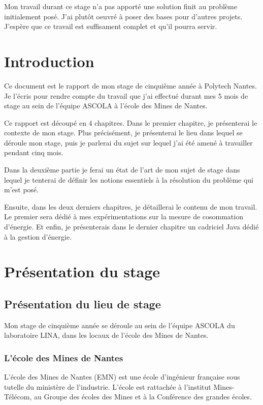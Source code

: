\documentclass[a4paper, 11pt]{report}
\begin{document}
Mon travail durant ce stage n'a pas apporté une solution finit au problème initialement posé. J'ai plutôt oeuvré à poser des bases pour d'autres projets. J'espère que ce travail est suffisament complet et qu'il pourra servir.

\newpage

\tableofcontents

\chapter{Introduction}
Ce document est le rapport de mon stage de cinquième année à Polytech Nantes. Je l'écris pour rendre compte du travail que j'ai effectué durant mes 5 mois de stage au sein de l'équipe ASCOLA à l'école des Mines de Nantes.

Ce rapport est découpé en 4 chapitres. Dans le premier chapitre, je présenterai le contexte de mon stage. Plus précisément, je présenterai le lieu dans lequel se déroule mon stage, puis je parlerai du sujet sur lequel j'ai été amené à travailler pendant cinq mois.

Dans la deuxième partie je ferai un état de l'art de mon sujet de stage dans lequel je tenterai de définir les notions essentiels à la résolution du problème qui m'est posé.

Ensuite, dans les deux derniers chapitres, je détaillerai le contenu de mon travail. Le premier sera dédié à mes expérimentations sur la mesure de cosommation d'énergie. Et enfin, je présenterais dans le dernier chapitre un cadriciel Java dédié à la gestion d'énergie.

\chapter{Présentation du stage}
	\section{Présentation du lieu de stage}
Mon stage de cinquième année se déroule au sein de l’équipe ASCOLA du laboratoire LINA, dans les locaux de l’école des Mines de Nantes.
		\subsection{L'école des Mines de Nantes}
L’école des Mines de Nantes (EMN) est une école d’ingénieur française sous tutelle du ministère de l’industrie. L’école est rattachée à l’institut Mines-Télécom, au Groupe des écoles des Mines et à la Conférence des grandes écoles.
\end{document}
